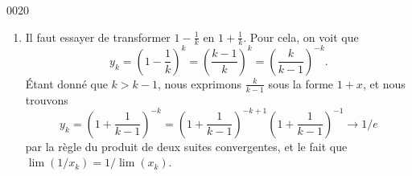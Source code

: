 \begin{corrige}{0020}
\begin{enumerate}
\begin{enumerate}
\item 
Il faut essayer de transformer $1-\frac{1}{ k }$ en $1+\frac{1}{ k }$. Pour cela, on voit que
\begin{equation}
	y_k=\left( 1-\frac{1}{ k } \right)^k=\left( \frac{ k-1 }{ k } \right)^k=\left( \frac{ k }{ k-1 } \right)^{-k}.
\end{equation}
Étant donné que $k>k-1$, nous exprimons $\frac{ k }{ k-1 }$ sous la forme $1+x$, et nous trouvons
\begin{equation}
	y_k=\left( 1+\frac{1}{ k-1 } \right)^{-k}=\left( 1+\frac{1}{ k-1 } \right)^{-k+1}\left( 1+\frac{ 1 }{ k-1 } \right)^{-1}\to 1/e
\end{equation}
par la règle du produit de deux suites convergentes, et le fait que $\lim(1/x_k) = 1/\lim(x_k)$.
\end{enumerate}
\end{enumerate}
\end{corrige}
